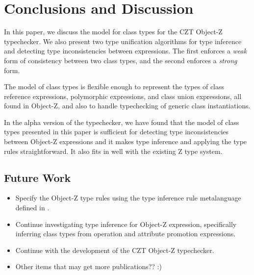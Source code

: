 \section{Conclusions and Discussion}

In this paper, we discuss the model for class types for the CZT
Object-Z typechecker. We also present two type unification algorithms
for type inference and detecting type inconsistencies between
expressions. The first enforces a {\em weak} form of consistency
between two class types, and the second enforces a {\em strong} form.

The model of class types is flexible enough to represent the types of
class reference expressions, polymorphic expressions, and class union
expressions, all found in Object-Z, and also to handle typechecking of
generic class instantiations.

In the alpha version of the typechecker, we have found that the model
of class types presented in this paper is sufficient for detecting
type inconsistencies between Object-Z expressions and it makes type
inference and applying the type rules straightforward. It also fits in
well with the existing Z type system.

\subsection{Future Work}

\begin{itemize}
  \item Specify the Object-Z type rules using the type inference rule
  metalanguage defined in \theStandard \cite{isoz}.
  \item Continue investigating type inference for Object-Z expression,
  specifically inferring class types from operation and attribute
  promotion expressions.
  \item Continue with the development of the CZT Object-Z typechecker.
  \item Other items that may get more publications?? :)
\end{itemize}
